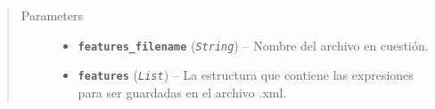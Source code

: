 \documentclass[class=report, crop=false]{standalone}
\begin{document}
\begin{fulllineitems}
\begin{fulllineitems}
\begin{quote}\begin{description}
\item[{Parameters}] \leavevmode\begin{itemize}
\item \textbf{\texttt{features\_filename}} (\emph{\texttt{String}}) -- Nombre del archivo en cuestión.
\item \textbf{\texttt{features}} (\emph{\texttt{List}}) -- La estructura que contiene las expresiones para ser guardadas
en el archivo .xml.
\end{itemize}
\end{description}\end{quote}

\end{fulllineitems}

\end{fulllineitems}

\end{document}
